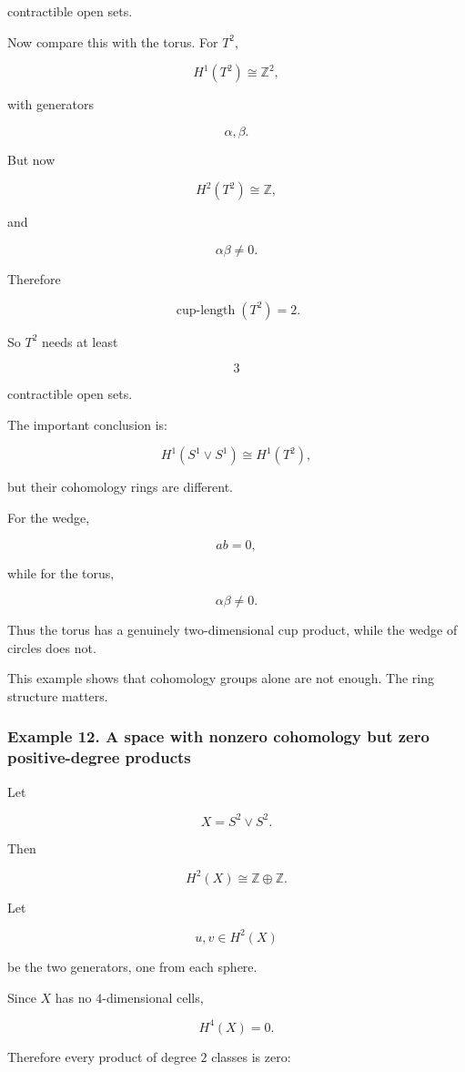 \documentclass[12pt,a4paper]{article}
\theoremstyle{notespace}
\begin{document}
contractible open sets.

Now compare this with the torus. For \(T^2\),

\[
H^1(T^2)
\cong
\mathbb Z^2,
\]

with generators

\[
\alpha,\beta.
\]

But now

\[
H^2(T^2)\cong \mathbb Z,
\]

and

\[
\alpha\beta\neq 0.
\]

Therefore

\[
\operatorname{cup\text{-}length}(T^2)=2.
\]

So \(T^2\) needs at least

\[
3
\]

contractible open sets.

The important conclusion is:

\[
\boxed{
	H^1(S^1\vee S^1)\cong H^1(T^2),
}
\]

but their cohomology rings are different.

For the wedge,

\[
ab=0,
\]

while for the torus,

\[
\alpha\beta\neq 0.
\]

Thus the torus has a genuinely two-dimensional cup product, while the wedge of circles does not.

This example shows that cohomology groups alone are not enough. The ring structure matters.

\subsubsection{Example 12. A space with nonzero cohomology but zero positive-degree products}

Let

\[
X=S^2\vee S^2.
\]

Then

\[
H^2(X)\cong \mathbb Z\oplus \mathbb Z.
\]

Let

\[
u,v\in H^2(X)
\]

be the two generators, one from each sphere.

Since \(X\) has no \(4\)-dimensional cells,

\[
H^4(X)=0.
\]

Therefore every product of degree \(2\) classes is zero:
\end{document}
